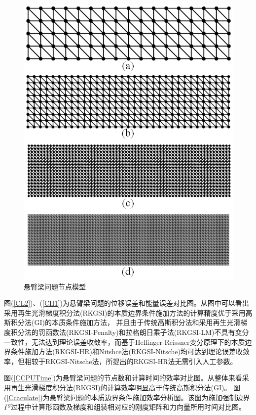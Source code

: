 \begin{figure}[H]
    \centering
    \includegraphics[scale=0.7]{figure/E/cantilever/cantilever.mesh.png}
    \caption{悬臂梁问题节点模型}\label{cantilever.mesh}
\end{figure}
图(\ref{CL2})、(\ref{CH1})为悬臂梁问题的位移误差和能量误差对比图。从图中可以看出采用再生光滑梯度积分法(RKGSI)的本质边界条件施加方法的计算精度优于采用高斯积分法(GI)的本质条件施加方法，
并且由于传统高斯积分法和采用再生光滑梯度积分法的罚函数法(RKGSI-Penalty)和拉格朗日乘子法(RKGSI-LM)不具有变分一致性，无法达到理论误差收敛率，而基于Hellinger-Reissner变分原理下的本质边界条件施加方法(RKGSI-HR)和Nitshce法(RKGSI-Nitsche)均可达到理论误差收敛率，但相较于RKGSI-Nitsche法，所提出的RKGSI-HR法无需引入人工参数。\par
图(\ref{CCPUTime})为悬臂梁问题的节点数和计算时间的效率对比图。从整体来看采用再生光滑梯度积分法(RKGSI)的计算效率明显高于传统高斯积分法(GI)。
图(\ref{Ccaculate})为悬臂梁问题的本质边界条件施加效率分析图。该图为施加强制边界$\Gamma^g$过程中计算形函数及梯度和组装相对应的刚度矩阵和力向量所用时间对比图。
